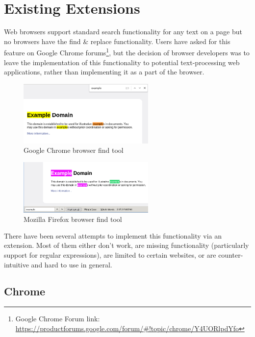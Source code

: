 \documentclass[bsc,frontabs,twoside,singlespacing,parskip,deptreport]{infthesis}
\begin{document}
\section{Existing Extensions}
Web browsers support standard search functionality for any text on a page but no browsers have the find \& replace functionality. Users have asked for this feature on Google Chrome forums\footnote{Google Chrome Forum link: \href{https://productforums.google.com/forum/\#!topic/chrome/Y4UORlpdYfo}{https://productforums.google.com/forum/\#!topic/chrome/Y4UORlpdYfo}}, but the decision of browser developers was to leave the implementation of this functionality to potential text-processing web applications, rather than implementing it as a part of the browser.

\begin{figure}[h]
\centering
\includegraphics[width=0.6\textwidth]{../docs/browser-find-toolbar/chrome-find.png}
\caption{Google Chrome browser find tool}
\end{figure}

\begin{figure}[h]
\centering
\includegraphics[width=0.6\textwidth]{../docs/browser-find-toolbar/firefox-find.png}
\caption{Mozilla Firefox browser find tool}
\end{figure}

There have been several attempts to implement this functionality via an extension. Most of them either don't work, are missing functionality (particularly support for regular expressions), are limited to certain websites, or are counter-intuitive and hard to use in general. 

\subsection{Chrome}
\end{document}
